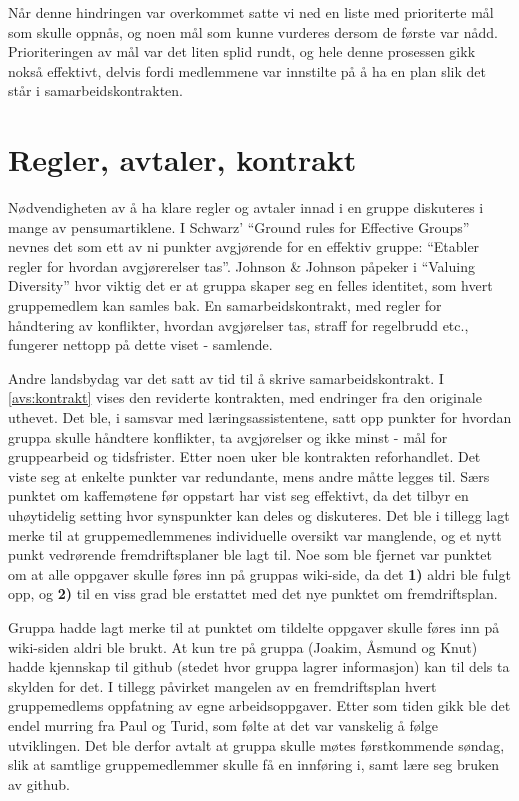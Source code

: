 Når denne hindringen var overkommet satte vi ned en liste med prioriterte mål
som skulle oppnås, og noen mål som kunne vurderes dersom de første var
nådd. Prioriteringen av mål var det liten splid rundt, og hele denne prosessen
gikk nokså effektivt, delvis fordi medlemmene var innstilte på å ha en plan slik
det står i samarbeidskontrakten. 

\section{Regler, avtaler, kontrakt}
\label{sec:kontrakt}
Nødvendigheten av å ha klare regler og avtaler innad i en gruppe diskuteres i
mange av pensumartiklene. I Schwarz' ``Ground rules for Effective Groups''
\cite{schwarz} nevnes det som ett av ni punkter avgjørende for en effektiv
gruppe: ``Etabler regler for hvordan avgjørerelser
tas''. Johnson \& Johnson påpeker i ``Valuing Diversity'' \cite{jj} hvor viktig det er at gruppa skaper seg en felles
identitet, som hvert gruppemedlem kan samles bak. En samarbeidskontrakt, med
regler for håndtering av konflikter, hvordan avgjørelser tas, straff for
regelbrudd etc., fungerer nettopp på dette viset -
samlende. 

Andre landsbydag var det satt av tid til å skrive samarbeidskontrakt. 
I \cref{avs:kontrakt} vises den reviderte kontrakten, med endringer fra den
originale uthevet. Det ble, i
samsvar med læringsassistentene, satt opp punkter for hvordan gruppa skulle
håndtere konflikter, ta avgjørelser og ikke minst - mål for gruppearbeid og
tidsfrister. Etter noen uker ble kontrakten reforhandlet. Det viste seg at
enkelte punkter var redundante, mens andre måtte legges til. Særs punktet om
kaffemøtene før oppstart har vist seg effektivt, da det tilbyr en uhøytidelig
setting hvor synspunkter kan deles og diskuteres. Det ble i
tillegg lagt merke til at gruppemedlemmenes individuelle oversikt var manglende, og et nytt
punkt vedrørende fremdriftsplaner ble lagt til. Noe som ble fjernet var punktet
om at alle oppgaver skulle føres inn på gruppas wiki-side, da det \textbf{1)} aldri ble
fulgt opp, og \textbf{2)} til en viss grad ble erstattet med det nye punktet om
fremdriftsplan. 

Gruppa hadde lagt merke til at punktet om tildelte oppgaver skulle føres
inn på wiki-siden aldri ble brukt. At kun tre på gruppa (Joakim, Åsmund og Knut)
hadde kjennskap til github (stedet hvor gruppa lagrer informasjon) kan til dels
ta skylden for det. I tillegg påvirket mangelen av en fremdriftsplan hvert
gruppemedlems oppfatning av egne arbeidsoppgaver. Etter som tiden gikk ble det
endel murring fra Paul og Turid, som følte at det var vanskelig
å følge utviklingen. Det ble derfor avtalt at gruppa skulle møtes førstkommende
søndag, slik at samtlige gruppemedlemmer skulle få en innføring i, samt lære seg
bruken av github. 

